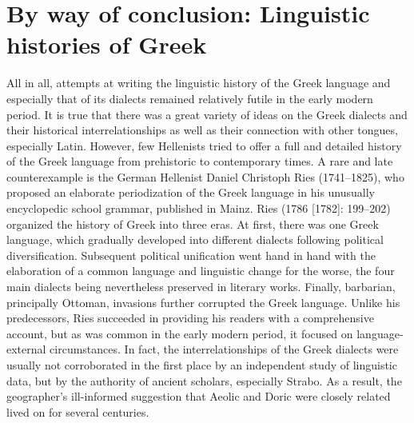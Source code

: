 \section{By way of conclusion: Linguistic histories of Greek}

All in all, attempts at writing the linguistic history of the Greek language and especially that of its dialects remained relatively futile in the early modern period. It is true that there was a great variety of ideas on the Greek dialects and their historical interrelationships as well as their connection with other tongues, especially Latin. However, few Hellenists tried to offer a full and detailed history of the Greek language from prehistoric to contemporary times. A rare and late counterexample is the German Hellenist Daniel Christoph Ries (1741–1825), who proposed an elaborate periodization of the Greek language in his unusually encyclopedic school grammar, published in Mainz. Ries (1786 [1782]: 199–202) organized the history of Greek into three eras. At first, there was one Greek language, which gradually developed into different dialects following political diversification. Subsequent political unification went hand in hand with the elaboration of a common language and linguistic change for the worse, the four main dialects being nevertheless preserved in literary works. Finally, barbarian, principally Ottoman, invasions further corrupted the Greek language. Unlike his predecessors, Ries succeeded in providing his readers with a comprehensive account, but as was common in the early modern period, it focused on language-external circumstances. In fact, the interrelationships of the Greek dialects were usually not corroborated in the first place by an independent study of linguistic data, but by the authority of ancient scholars, especially Strabo. As a result, the geographer’s ill-informed suggestion that Aeolic and Doric were closely related lived on for several centuries.

